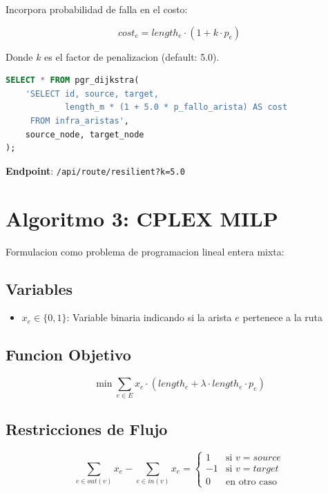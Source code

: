 \documentclass[12pt,a4paper]{article}
\begin{document}
Incorpora probabilidad de falla en el costo:

\begin{equation}
cost_e = length_e \cdot (1 + k \cdot p_e)
\end{equation}

Donde $k$ es el factor de penalizacion (default: 5.0).

\begin{lstlisting}[language=SQL]
SELECT * FROM pgr_dijkstra(
    'SELECT id, source, target,
            length_m * (1 + 5.0 * p_fallo_arista) AS cost
     FROM infra_aristas',
    source_node, target_node
);
\end{lstlisting}

\textbf{Endpoint}: \texttt{/api/route/resilient?k=5.0}

\section{Algoritmo 3: CPLEX MILP}

Formulacion como problema de programacion lineal entera mixta:

\subsection{Variables}
\begin{itemize}
    \item $x_e \in \{0, 1\}$: Variable binaria indicando si la arista $e$ pertenece a la ruta
\end{itemize}

\subsection{Funcion Objetivo}
\begin{equation}
\min \sum_{e \in E} x_e \cdot (length_e + \lambda \cdot length_e \cdot p_e)
\end{equation}

\subsection{Restricciones de Flujo}
\begin{equation}
\sum_{e \in out(v)} x_e - \sum_{e \in in(v)} x_e =
\begin{cases}
1 & \text{si } v = source \\
-1 & \text{si } v = target \\
0 & \text{en otro caso}
\end{cases}
\end{equation}
\end{document}
